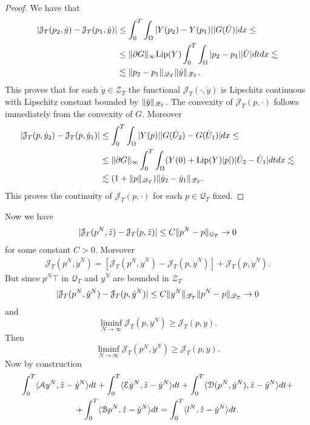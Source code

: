 \begin{proof}
We have that
\[
\begin{split}
|\mathcal{J}_T(p_2,\dot y)-\mathcal{J}_T(p_1,\dot y)|&\le\int_0^T\int_\Omega|Y(p_2)-Y(p_1)||G(\dot{ U})|dx\le\\
&\le\lVert\partial G\rVert_\infty\text{Lip}(Y)\int_0^T\int_\Omega|p_2-p_1||\dot{ U}|dtdx\lesssim\\
&\lesssim\lVert p_2-p_1\rVert_{\mathscr{Q}_T}\lVert\dot y\rVert_{\mathscr{Z}_T}.
\end{split}
\]
This proves that for each $\dot y\in\mathscr{Z}_T$ the functional $\mathcal{J}_T(\cdot,\dot y)$ is Lipschitz continuous with Lipschitz constant bounded by $\lVert\dot y\rVert_{\mathscr{Z}_T}$. The convexity of $\mathcal{J}_T(p,\cdot)$ follows immediately from the convexity of $G$. Moreover
\[
\begin{split}
|\mathcal{J}_T(p,\dot y_2)-\mathcal{J}_T(p,\dot y_1)|&\le\int_0^T\int_\Omega|Y(p)||G(\dot{ U}_2)-G(\dot{ U}_1)|dx\le\\
&\le\lVert\partial G\rVert_\infty\int_0^T\int_\Omega(Y(0)+\text{Lip}(Y)|p|)|\dot{ U}_2-\dot{ U}_1|dtdx\lesssim\\
&\lesssim(1+\lVert p\rVert_{\mathscr{Q}_T})\lVert\dot y_2-\dot y_1\rVert_{\mathscr{Z}_T}.
\end{split}
\]
This proves the continuity of $\mathcal{J}_T(p,\cdot)$ for each $p\in\mathscr{Q}_T$ fixed.
\end{proof}
Now we have
\[
|\mathcal{J}_T(p^N,\tilde z)-\mathcal{J}_T(p,\tilde z)|\le C\lVert p^N-p\rVert_{\mathcal{Q}_T}\to 0
\]
for some constant $C>0$. Moreover
\[
\begin{split}
\mathcal{J}_T(p^N,\dot y^N)=[\mathcal{J}_T(p^N,\dot y^N)-\mathcal{J}_T(p,\dot y^N)]+\mathcal{J}_T(p,\dot y^N).
\end{split}
\]
But since $p^N\top$ in $\mathscr{Q}_T$ and $y^N$ are bounded in $\mathscr{Z}_T$
\[
|\mathcal{J}_T(p^N,\dot y^N)-\mathcal{J}_T(p,\dot y^N)|\le C\lVert y^N\rVert_{\mathscr{Z}_T}\lVert p^N-p\rVert_{\mathscr{Q}_T}\to0
\]
and
\[
\liminf_{N\to\infty}\mathcal{J}_T(p,\dot y^N)\ge\mathcal{J}_T(p,\dot y).
\]
Then
\[
\liminf_{N\to\infty}\mathcal{J}_T(p^N,\dot y^N)\ge\mathcal{J}_T(p,\dot y).
\]
Now by construction
\begin{multline*}
\int_0^T\langle\mathcal{A}y^N,\tilde z-\dot y^N\rangle dt+\int_0^T\langle\mathcal{E}\dot y^N,\tilde z-\dot y^N\rangle dt+\int_0^T\langle\mathcal{D}(p^N,\dot y^N),\tilde z-\dot y^N\rangle dt+\\
+\int_0^T\langle\mathcal{B}p^N,\tilde z-\dot y^N\rangle dt=\int_0^T\langle l^N,\tilde z-\dot y^N\rangle dt.
\end{multline*}
